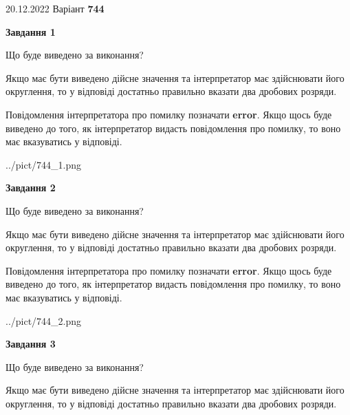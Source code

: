 \documentclass[12pt, ukrainian]{article}
\begin{document}
{20.12.2022 Варіант \No \textbf { 744 }\par}
{
\begin {Large}

{\begin {center}\textbf{Завдання 1}\end {center}}\par
Що буде виведено за виконання? \par

Якщо має бути виведено дійсне значення та інтерпретатор має здійснювати його округлення, 
то у відповіді достатньо правильно вказати два дробових розряди.

Повідомлення інтерпретатора про помилку позначати \textbf{error}.
Якщо щось буде виведено до того, як інтерпретатор видасть повідомлення про помилку, 
то воно має вказуватись у відповіді. \par

\begin{center}
	{../pict/744_1.png}
\end{center}
\newpage

{\begin {center}\textbf{Завдання 2}\end {center}}\par
Що буде виведено за виконання? \par

Якщо має бути виведено дійсне значення та інтерпретатор має здійснювати його округлення, 
то у відповіді достатньо правильно вказати два дробових розряди.

Повідомлення інтерпретатора про помилку позначати \textbf{error}.
Якщо щось буде виведено до того, як інтерпретатор видасть повідомлення про помилку, 
то воно має вказуватись у відповіді. \par

\begin{center}
	{../pict/744_2.png}
\end{center}
\newpage

{\begin {center}\textbf{Завдання 3}\end {center}}\par
Що буде виведено за виконання? \par

Якщо має бути виведено дійсне значення та інтерпретатор має здійснювати його округлення, 
то у відповіді достатньо правильно вказати два дробових розряди.


\end{Large}}
\end{document}
